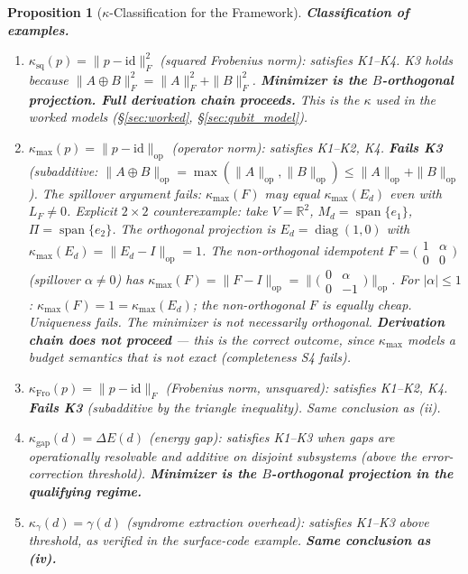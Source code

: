 \documentclass[11pt,a4paper]{article}
\newtheorem{proposition}[theorem]{Proposition}
\theoremstyle{definition}
\DeclareMathOperator{\spn}{span}
\DeclareMathOperator{\diag}{diag}
\begin{document}
\begin{proposition}[$\kappa$-Classification for the Framework]
\smallskip\noindent\textbf{Classification of examples.}
\begin{enumerate}[nosep,label=(\roman*),leftmargin=2em]
\item $\kappa_{\mathrm{sq}}(p) = \|p - \mathrm{id}\|_F^2$ (squared Frobenius norm): satisfies K1--K4.  K3 holds because $\|A \oplus B\|_F^2 = \|A\|_F^2 + \|B\|_F^2$.  \textbf{Minimizer is the $B$-orthogonal projection.  Full derivation chain proceeds.}  This is the $\kappa$ used in the worked models (\S\ref{sec:worked}, \S\ref{sec:qubit_model}).
\item $\kappa_{\max}(p) = \|p - \mathrm{id}\|_{\mathrm{op}}$ (operator norm): satisfies K1--K2, K4.  \textbf{Fails K3} (subadditive: $\|A \oplus B\|_{\mathrm{op}} = \max(\|A\|_{\mathrm{op}}, \|B\|_{\mathrm{op}}) \le \|A\|_{\mathrm{op}} + \|B\|_{\mathrm{op}}$).  The spillover argument fails: $\kappa_{\max}(F)$ may equal $\kappa_{\max}(E_d)$ even with $L_F \ne 0$.  \textit{Explicit $2 \times 2$ counterexample:} take $V = \mathbb{R}^2$, $M_d = \spn\{e_1\}$, $\Pi = \spn\{e_2\}$.  The orthogonal projection is $E_d = \diag(1,0)$ with $\kappa_{\max}(E_d) = \|E_d - I\|_{\mathrm{op}} = 1$.  The non-orthogonal idempotent $F = \bigl(\begin{smallmatrix} 1 & \alpha \\ 0 & 0 \end{smallmatrix}\bigr)$ (spillover $\alpha \ne 0$) has $\kappa_{\max}(F) = \|F - I\|_{\mathrm{op}} = \|\bigl(\begin{smallmatrix} 0 & \alpha \\ 0 & -1 \end{smallmatrix}\bigr)\|_{\mathrm{op}}$.  For $|\alpha| \le 1$: $\kappa_{\max}(F) = 1 = \kappa_{\max}(E_d)$; the non-orthogonal $F$ is equally cheap.  Uniqueness fails.  The minimizer is not necessarily orthogonal.  \textbf{Derivation chain does not proceed} --- this is the correct outcome, since $\kappa_{\max}$ models a budget semantics that is not exact (completeness S4 fails).
\item $\kappa_{\mathrm{Fro}}(p) = \|p - \mathrm{id}\|_F$ (Frobenius norm, unsquared): satisfies K1--K2, K4.  \textbf{Fails K3} (subadditive by the triangle inequality).  Same conclusion as (ii).
\item $\kappa_{\mathrm{gap}}(d) = \Delta E(d)$ (energy gap): satisfies K1--K3 when gaps are operationally resolvable and additive on disjoint subsystems (above the error-correction threshold).  \textbf{Minimizer is the $B$-orthogonal projection in the qualifying regime.}
\item $\kappa_{\gamma}(d) = \gamma(d)$ (syndrome extraction overhead): satisfies K1--K3 above threshold, as verified in the surface-code example.  \textbf{Same conclusion as (iv).}
\end{enumerate}


\end{proposition}
\end{document}
